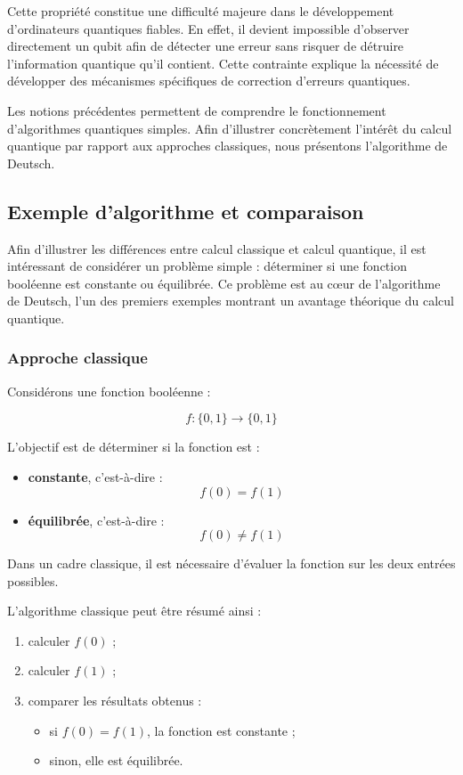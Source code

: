 \documentclass[a4paper,12pt]{article}
\begin{document}
Cette propriété constitue une difficulté majeure dans le développement d’ordinateurs quantiques fiables. En effet, il devient impossible d’observer directement un qubit afin de détecter une erreur sans risquer de détruire l’information quantique qu’il contient. Cette contrainte explique la nécessité de développer des mécanismes spécifiques de correction d’erreurs quantiques.

Les notions précédentes permettent de comprendre le fonctionnement d’algorithmes quantiques simples. Afin d’illustrer concrètement l’intérêt du calcul quantique par rapport aux approches classiques, nous présentons l’algorithme de Deutsch.
\subsection{Exemple d'algorithme et comparaison}

Afin d’illustrer les différences entre calcul classique et calcul quantique, il est intéressant de considérer un problème simple : déterminer si une fonction booléenne est constante ou équilibrée. Ce problème est au cœur de l’algorithme de Deutsch, l’un des premiers exemples montrant un avantage théorique du calcul quantique.

\subsubsection{Approche classique}

Considérons une fonction booléenne :

\[
f : \{0,1\} \rightarrow \{0,1\}
\]

L’objectif est de déterminer si la fonction est :

\begin{itemize}
    \item \textbf{constante}, c’est-à-dire :
    \[
    f(0)=f(1)
    \]
    
    \item \textbf{équilibrée}, c’est-à-dire :
    \[
    f(0)\neq f(1)
    \]
\end{itemize}

Dans un cadre classique, il est nécessaire d’évaluer la fonction sur les deux entrées possibles.

L’algorithme classique peut être résumé ainsi :

\begin{enumerate}
    \item calculer $f(0)$ ;
    \item calculer $f(1)$ ;
    \item comparer les résultats obtenus :
    \begin{itemize}
        \item si $f(0)=f(1)$, la fonction est constante ;
        \item sinon, elle est équilibrée.
    \end{itemize}
\end{enumerate}
\end{document}
